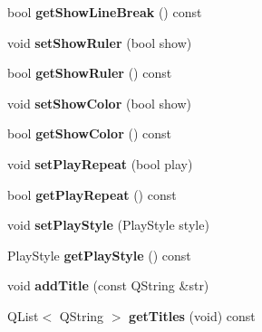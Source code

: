 \begin{DoxyCompactItemize}
bool {\bfseries get\+Show\+Line\+Break} () const
\item 
\mbox{\label{class_o_v_e_1_1_ove_song_a09096f684b9ac0d9b31cddcf4c9ba1f1}} 
void {\bfseries set\+Show\+Ruler} (bool show)
\item 
\mbox{\label{class_o_v_e_1_1_ove_song_a4e4d97925bf91d4c9ada163ab890b1e0}} 
bool {\bfseries get\+Show\+Ruler} () const
\item 
\mbox{\label{class_o_v_e_1_1_ove_song_ad141c4917a17bef1f0dc2832b320abb7}} 
void {\bfseries set\+Show\+Color} (bool show)
\item 
\mbox{\label{class_o_v_e_1_1_ove_song_a2dc5953e63bdf4013683a5bc0b03a4ae}} 
bool {\bfseries get\+Show\+Color} () const
\item 
\mbox{\label{class_o_v_e_1_1_ove_song_a34e35bd5c00a040d4502e9c8a3f6fd4b}} 
void {\bfseries set\+Play\+Repeat} (bool play)
\item 
\mbox{\label{class_o_v_e_1_1_ove_song_af7a88b820598d2cde4a6b37fbb56a490}} 
bool {\bfseries get\+Play\+Repeat} () const
\item 
\mbox{\label{class_o_v_e_1_1_ove_song_a57735a8c39d6be142b11cc9f7ab96dbf}} 
void {\bfseries set\+Play\+Style} (Play\+Style style)
\item 
\mbox{\label{class_o_v_e_1_1_ove_song_ac856764171a1f274fc059b6aefdcc992}} 
Play\+Style {\bfseries get\+Play\+Style} () const
\item 
\mbox{\label{class_o_v_e_1_1_ove_song_aff3d1367b848466363b65a89be0d2459}} 
void {\bfseries add\+Title} (const Q\+String \&str)
\item 
\mbox{\label{class_o_v_e_1_1_ove_song_af2cf650645a774b6487baac01859dea2}} 
Q\+List$<$ Q\+String $>$ {\bfseries get\+Titles} (void) const
\item 
\mbox{\label{class_o_v_e_1_1_ove_song_aa18023ca2fa2b90d224061517db13218}} 

\end{DoxyCompactItemize}
